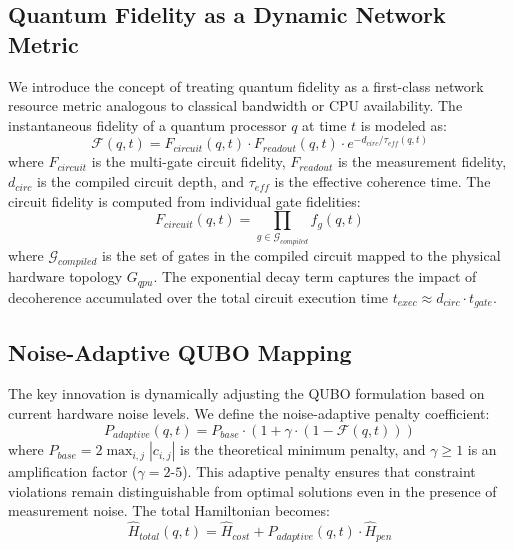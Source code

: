 \documentclass[lettersize,journal]{IEEEtran}
\begin{document}
\subsection{Quantum Fidelity as a Dynamic Network Metric}
\label{subsec:fidelity_metric}

We introduce the concept of treating quantum fidelity as a first-class network resource metric analogous to classical bandwidth or CPU availability. The instantaneous fidelity of a quantum processor $q$ at time $t$ is modeled as:
\begin{equation}
\mathcal{F}(q, t) = F_{circuit}(q, t) \cdot F_{readout}(q, t) \cdot e^{-d_{circ}/\tau_{eff}(q, t)}
\label{eq:total_fidelity}
\end{equation}
where $F_{circuit}$ is the multi-gate circuit fidelity, $F_{readout}$ is the measurement fidelity, $d_{circ}$ is the compiled circuit depth, and $\tau_{eff}$ is the effective coherence time. The circuit fidelity is computed from individual gate fidelities:
\begin{equation}
F_{circuit}(q, t) = \prod_{g \in \mathcal{G}_{compiled}} f_g(q, t)
\label{eq:circuit_fidelity}
\end{equation}
where $\mathcal{G}_{compiled}$ is the set of gates in the compiled circuit mapped to the physical hardware topology $G_{qpu}$. The exponential decay term captures the impact of decoherence accumulated over the total circuit execution time $t_{exec} \approx d_{circ} \cdot t_{gate}$.

\subsection{Noise-Adaptive QUBO Mapping}
\label{subsec:noise_adaptive}

The key innovation is dynamically adjusting the QUBO formulation based on current hardware noise levels. We define the noise-adaptive penalty coefficient:
\begin{equation}
P_{adaptive}(q, t) = P_{base} \cdot \left(1 + \gamma \cdot (1 - \mathcal{F}(q, t))\right)
\label{eq:adaptive_penalty}
\end{equation}
where $P_{base} = 2\max_{i,j}|c_{i,j}|$ is the theoretical minimum penalty, and $\gamma \geq 1$ is an amplification factor ($\gamma = 2$-$5$). This adaptive penalty ensures that constraint violations remain distinguishable from optimal solutions even in the presence of measurement noise. The total Hamiltonian becomes:
\begin{equation}
\hat{H}_{total}(q, t) = \hat{H}_{cost} + P_{adaptive}(q, t) \cdot \hat{H}_{pen}
\label{eq:adaptive_hamiltonian}
\end{equation}
\end{document}
